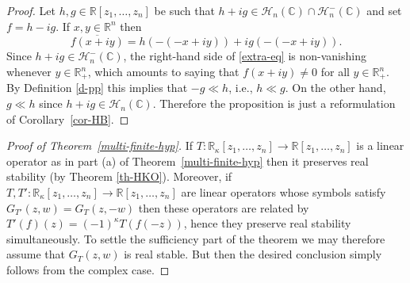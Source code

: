 \documentclass[10pt,reqno]{amsart}
\theoremstyle{plain}
\theoremstyle{definition}
\theoremstyle{remark}
\numberwithin{equation}{section}
\newcommand{\HH}{\mathcal{H}}
\newcommand{\RR}{\mathbb{R}}
\newcommand{\CC}{\mathbb{C}}
\begin{document}
\begin{proof}
Let $h,g \in \RR[z_1,\ldots, z_n]$ be such that $h+ig \in \HH_n(\CC)\cap 
\HH_n^{-}(\CC)$ and set $f= h-ig$. If $x,y \in \RR^n$ then 
\begin{equation}\label{extra-eq}
\overline{f(x+iy)}= h(-(-x+iy))+ig(-(-x+iy)).
\end{equation}
Since $h+ig \in \HH_n^{-}(\CC)$, the right-hand side of 
\eqref{extra-eq} is non-vanishing whenever $y\in\RR_+^n$, which 
amounts to saying that $f(x+iy)\neq 0$ for all 
$y\in\RR_+^n$. By Definition \ref{d-pp} this implies that 
$-g \ll h$, i.e., $h \ll g$. On the other hand, $g\ll h$ since 
$h+ig \in \HH_n(\CC)$. Therefore the 
proposition is just a reformulation of Corollary~\ref{cor-HB}. 
\end{proof}
 
\begin{proof}[Proof of Theorem~\ref{multi-finite-hyp}]
If $T:\RR_\kappa[z_1,\ldots, z_n] \rightarrow \RR[z_1,\ldots, z_n]$ 
is a linear operator as in part (a) of Theorem~\ref{multi-finite-hyp} then it 
preserves real stability (by Theorem \ref{th-HKO}). Moreover, 
if $T,T' : \RR_\kappa[z_1,\ldots, z_n] \rightarrow \RR[z_1,\ldots, z_n]$
are linear operators whose symbols satisfy $G_{T'}(z,w)=G_T(z,-w)$ 
then these operators are related by 
$T'(f)(z)=(-1)^{\kappa}T(f(-z))$, hence they preserve real stability simultaneously. 
To settle the sufficiency part of the theorem we may therefore 
assume that $G_T(z,w)$ is real stable. But then the desired conclusion 
simply follows from the complex case. 


\end{proof}
\end{document}
